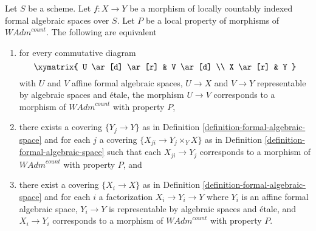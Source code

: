 \begin{lemma}
\label{lemma-property-defines-property-morphisms}
Let $S$ be a scheme. Let $f : X \to Y$ be a morphism of
locally countably indexed formal algebraic spaces over $S$.
Let $P$ be a local property of morphisms of $\textit{WAdm}^{count}$.
The following are equivalent
\begin{enumerate}
\item for every commutative diagram
$$
\xymatrix{
U \ar[d] \ar[r] & V \ar[d] \\
X \ar[r] & Y
}
$$
with $U$ and $V$ affine formal algebraic spaces, $U \to X$ and $V \to Y$
representable by algebraic spaces and \'etale, the morphism $U \to V$
corresponds to a morphism of $\textit{WAdm}^{count}$ with property $P$,
\item there exists a covering $\{Y_j \to Y\}$ as in
Definition \ref{definition-formal-algebraic-space} and for each $j$
a covering $\{X_{ji} \to Y_j \times_Y X\}$ as in
Definition \ref{definition-formal-algebraic-space}
such that each $X_{ji} \to Y_j$  corresponds
to a morphism of $\textit{WAdm}^{count}$ with property $P$, and
\item there exist a covering $\{X_i \to X\}$ as in
Definition \ref{definition-formal-algebraic-space}
and for each $i$ a factorization $X_i \to Y_i \to Y$ where $Y_i$
is an affine formal algebraic space, $Y_i \to Y$ is representable
by algebraic spaces and \'etale, and $X_i \to Y_i$ corresponds
to a morphism of $\textit{WAdm}^{count}$ with property $P$.
\end{enumerate}
\end{lemma}

